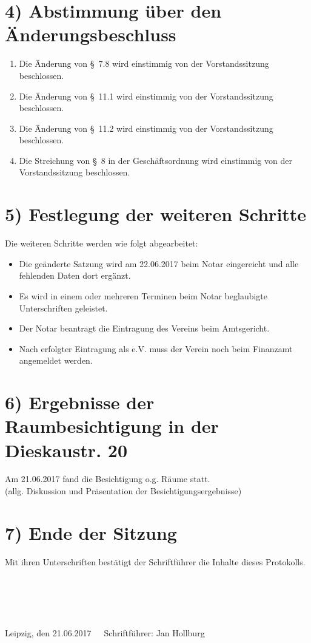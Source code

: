 \documentclass[10pt,a4paper]{scrartcl}
\newcommand{\eventdate}{21.06.2017}
\newcommand{\schriftfuehrer}{Jan Hollburg}
\begin{document}
\section*{4) Abstimmung {\"u}ber den {\"A}nderungsbeschluss}
	\begin{enumerate}
		\item Die {\"A}nderung von \S\ 7.8 wird einstimmig von der Vorstandssitzung beschlossen.\\
		\item Die {\"A}nderung von \S\ 11.1 wird einstimmig von der Vorstandssitzung beschlossen.\\
		\item Die {\"A}nderung von \S\ 11.2 wird einstimmig von der Vorstandssitzung beschlossen.\\
		\item Die Streichung von \S\ 8 in der Gesch{\"a}ftsordnung wird einstimmig von der Vorstandssitzung beschlossen.\\
	\end{enumerate}

\section*{5) Festlegung der weiteren Schritte}
    Die weiteren Schritte werden wie folgt abgearbeitet:
	\begin{itemize}
		\item Die ge{\"a}nderte Satzung wird am 22.06.2017 beim Notar eingereicht und alle fehlenden Daten dort erg{\"a}nzt.
		\item Es wird in einem oder mehreren Terminen beim Notar beglaubigte Unterschriften geleistet.
		\item Der Notar beantragt die Eintragung des Vereins beim Amtsgericht.
		\item Nach erfolgter Eintragung als e.V. muss der Verein noch beim Finanzamt angemeldet werden.
	\end{itemize}

\section*{6) Ergebnisse der Raumbesichtigung in der Dieskaustr. 20}
    Am 21.06.2017 fand die Besichtigung o.g. R{\"a}ume statt.\\
	(allg. Diskussion und Pr{\"a}sentation der Besichtigungsergebnisse)\\
	
\section*{7) Ende der Sitzung}
    Mit ihren Unterschriften best{\"a}tigt der Schriftf{\"u}hrer die Inhalte dieses Protokolls.
\\
\\
\\
\\
\\
\\
Leipzig, den \eventdate \ \ \ Schriftf{\"u}hrer: \schriftfuehrer
\end{document}
